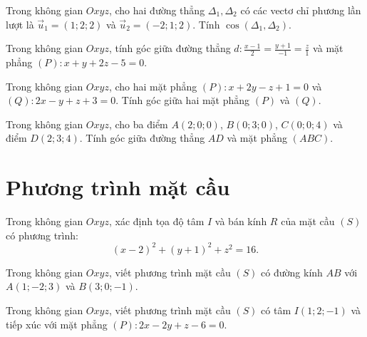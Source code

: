 \exercise Trong không gian $Oxyz$, cho hai đường thẳng $\Delta_1, \Delta_2$ có các vectơ chỉ phương lần lượt là $\vec{u}_1 = (1; 2; 2)$ và $\vec{u}_2 = (-2; 1; 2)$. Tính $\cos(\Delta_1, \Delta_2)$.

\exercise Trong không gian $Oxyz$, tính góc giữa đường thẳng $d: \frac{x - 1}{2} = \frac{y + 1}{-1} = \frac{z}{1}$ và mặt phẳng $(P): x + y + 2z - 5 = 0$.

\exercise Trong không gian $Oxyz$, cho hai mặt phẳng $(P): x + 2y - z + 1 = 0$ và $(Q): 2x - y + z + 3 = 0$. Tính góc giữa hai mặt phẳng $(P)$ và $(Q)$.

\exercise Trong không gian $Oxyz$, cho ba điểm $A(2; 0; 0)$, $B(0; 3; 0)$, $C(0; 0; 4)$ và điểm $D(2; 3; 4)$. Tính góc giữa đường thẳng $AD$ và mặt phẳng $(ABC)$.

\section{Phương trình mặt cầu}

\exercise Trong không gian $Oxyz$, xác định tọa độ tâm $I$ và bán kính $R$ của mặt cầu $(S)$ có phương trình:
$$(x - 2)^2 + (y + 1)^2 + z^2 = 16.$$

\exercise Trong không gian $Oxyz$, viết phương trình mặt cầu $(S)$ có đường kính $AB$ với $A(1; -2; 3)$ và $B(3; 0; -1)$.

\exercise Trong không gian $Oxyz$, viết phương trình mặt cầu $(S)$ có tâm $I(1; 2; -1)$ và tiếp xúc với mặt phẳng $(P): 2x - 2y + z - 6 = 0$.